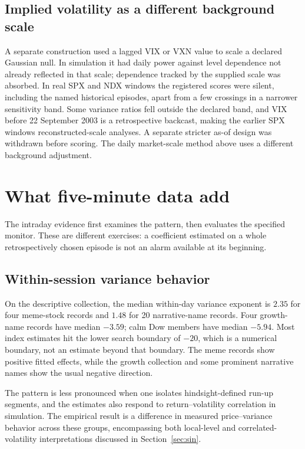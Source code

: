 \subsection{Implied volatility as a different background scale}
A separate construction used a lagged VIX or VXN value to scale a declared
Gaussian null. In simulation it had daily power against level dependence
not already reflected in that scale; dependence tracked by the supplied
scale was absorbed. In real SPX and NDX windows the registered scores were
silent, including the named historical episodes, apart from a few
crossings in a narrower sensitivity band. Some variance ratios fell outside
the declared band, and VIX before 22 September 2003 is a retrospective
backcast, making the earlier SPX windows reconstructed-scale analyses.
A separate stricter as-of design was withdrawn before scoring. The daily
market-scale method above uses a different background adjustment.

\section{What five-minute data add}\label{sec:intradayresults}
The intraday evidence first examines the pattern, then evaluates the
specified monitor. These are different exercises: a coefficient estimated
on a whole retrospectively chosen episode is not an alarm available at its
beginning.

\subsection{Within-session variance behavior}
On the descriptive collection, the median within-day variance exponent is
$2.35$ for four meme-stock records and $1.48$ for 20 narrative-name
records. Four growth-name records have median $-3.59$; calm Dow members
have median $-5.94$. Most index estimates hit the lower search boundary
of $-20$, which is a numerical boundary, not an estimate beyond that
boundary. The meme records show positive fitted effects, while the growth
collection and some prominent narrative names show the usual negative
direction.

The pattern is less pronounced when one isolates hindsight-defined
run-up segments, and the estimates also respond to return--volatility
correlation in simulation. The empirical result is a difference in measured price--variance behavior
across these groups, encompassing both local-level and correlated-volatility
interpretations discussed in Section~\ref{sec:sin}.

